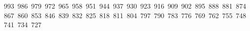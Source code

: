 \thispagestyle{empty}
\BgThispage
\begin{flushright}
    \mbox{993 986 979 972 965 958 951 944 937 930 923 916 909 902 895 888 881 874 867 860 853 846 839 832 825 818 811 804 797 790 783 776 769 762 755 748 741 734 727}
\end{flushright}
\vspace{3cm}
\tableofcontents

\newpage

\thispagestyle{empty}

\BgThispage


